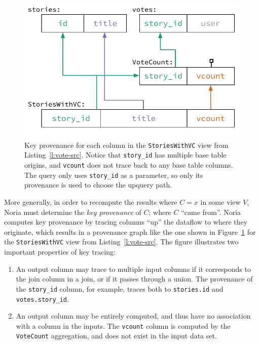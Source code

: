 \begin{figure}[t]
  \centering
  \includegraphics{diagrams/Key Provenance.pdf}
  \caption{Key provenance for each column in the \texttt{StoriesWithVC} view
  from Listing~\ref{l:vote-src}. Notice that \texttt{story\_id} has multiple
  base table origins, and \texttt{vcount} does not trace back to any base table
  columns. The query only uses \texttt{story\_id} as a parameter, so only its
  provenance is used to choose the upquery path.}
  \label{f:key-prov}
\end{figure}

More generally, in order to recompute the results where $C = x$ in some view
$V$, Noria must determine the \textit{key provenance} of $C$; where $C$ ``came
from''. Noria computes key provenance by tracing columns ``up'' the dataflow to
where they originate, which results in a provenance graph like the one shown in
Figure~\ref{f:key-prov} for the \texttt{StoriesWithVC} view from
Listing~\vref{l:vote-src}. The figure illustrates two important properties of
key tracing:

\begin{enumerate}
  \item An output column may trace to multiple input columns if it corresponds
    to the join column in a join, or if it passes through a union. The
    provenance of the \texttt{story\_id} column, for example, traces both to
    \texttt{stories.id} and \texttt{votes.story\_id}.
  \item An output column may be entirely computed, and thus have no association
    with a column in the inputs. The \texttt{vcount} column is computed by the
    \texttt{VoteCount} aggregation, and does not exist in the input data set.
\end{enumerate}

